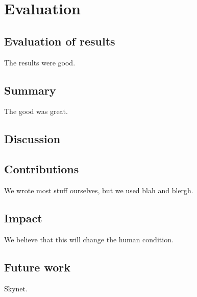 \chapter{Evaluation}
\section{Evaluation of results}
The results were good.


\section{Summary}
The good was great.


\section{Discussion}


\section{Contributions}
We wrote most stuff ourselves, but we used blah and blergh.


\section{Impact}
We believe that this will change the human condition.


\section{Future work}
Skynet.
